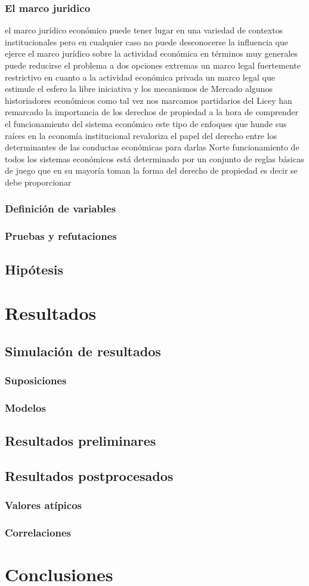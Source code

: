 \documentclass[12pt]{book}
\begin{document}
\subsection{El marco juridico}
el marco jurídico económico puede tener lugar en una variedad de contextos institucionales pero en cualquier caso no puede desconocerse la influencia que ejerce el marco jurídico sobre la actividad económica en términos muy generales puede reducirse el problema a dos opciones extremas un marco legal fuertemente restrictivo en cuanto a la actividad económica privada un marco legal que estimule el esfero la libre iniciativa y los mecanismos de Mercado algunos historiadores económicos como tal vez nos marcamos partidarios del Licey han remarcado la importancia de los derechos de propiedad a la hora de comprender el funcionamiento del sistema económico este tipo de enfoques que hunde sus raíces en la economía institucional revaloriza el papel del derecho entre los determinantes de las conductas económicas para darlas Norte funcionamiento de todos los sistemas económicos está determinado por un conjunto de reglas básicas de juego que en su mayoría toman la forma del derecho de propiedad es decir se debe proporcionar
\subsection{Definición de variables}
\subsection{Pruebas y refutaciones}
\section{Hipótesis}
\chapter{Resultados}
\section{Simulación de resultados}
\subsection{Suposiciones}
\subsection{Modelos}
\section{Resultados preliminares}
\section{Resultados postprocesados}
\subsection{Valores atípicos}
\subsection{Correlaciones}
\chapter{Conclusiones}
\end{document}
